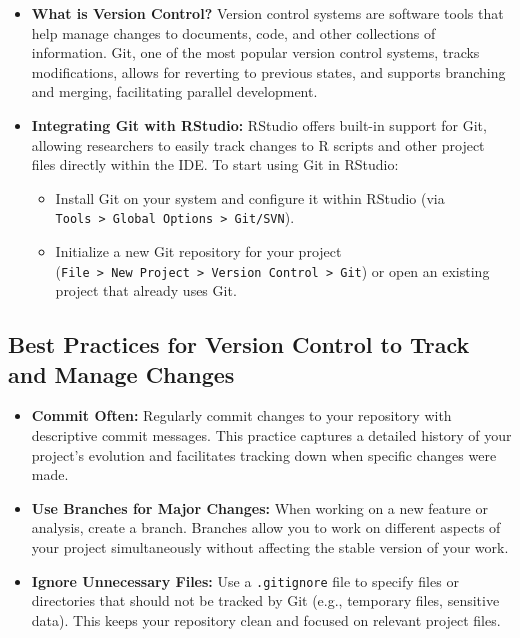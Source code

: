 \documentclass[
]{book}
\providecommand{\tightlist}{%
  \setlength{\itemsep}{0pt}\setlength{\parskip}{0pt}}
\begin{document}
\begin{itemize}
\item
  \textbf{What is Version Control?} Version control systems are software tools that help manage changes to documents, code, and other collections of information. Git, one of the most popular version control systems, tracks modifications, allows for reverting to previous states, and supports branching and merging, facilitating parallel development.
\item
  \textbf{Integrating Git with RStudio:} RStudio offers built-in support for Git, allowing researchers to easily track changes to R scripts and other project files directly within the IDE. To start using Git in RStudio:

  \begin{itemize}
  \tightlist
  \item
    Install Git on your system and configure it within RStudio (via \texttt{Tools\ \textgreater{}\ Global\ Options\ \textgreater{}\ Git/SVN}).
  \item
    Initialize a new Git repository for your project (\texttt{File\ \textgreater{}\ New\ Project\ \textgreater{}\ Version\ Control\ \textgreater{}\ Git}) or open an existing project that already uses Git.
  \end{itemize}
\end{itemize}

\hypertarget{best-practices-for-version-control-to-track-and-manage-changes}{%
\subsection*{Best Practices for Version Control to Track and Manage Changes}\label{best-practices-for-version-control-to-track-and-manage-changes}}

\begin{itemize}
\item
  \textbf{Commit Often:} Regularly commit changes to your repository with descriptive commit messages. This practice captures a detailed history of your project's evolution and facilitates tracking down when specific changes were made.
\item
  \textbf{Use Branches for Major Changes:} When working on a new feature or analysis, create a branch. Branches allow you to work on different aspects of your project simultaneously without affecting the stable version of your work.
\item
  \textbf{Ignore Unnecessary Files:} Use a \texttt{.gitignore} file to specify files or directories that should not be tracked by Git (e.g., temporary files, sensitive data). This keeps your repository clean and focused on relevant project files.
\end{itemize}
\end{document}
